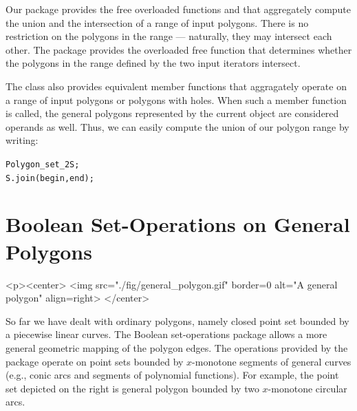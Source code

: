 Our package provides the free overloaded functions  and
 that aggregately compute the union and the intersection
of a range of input polygons. There is no restriction on the polygons in the
range --- naturally, they may intersect each other.
The package provides the overloaded free function 
 that determines whether the polygons in the
range defined by the two input iterators \ccc{[begin, end)} intersect.

The class  also provides equivalent member
functions that aggragately operate on a range of input polygons or
polygons with holes. When such a member function is called, the general 
polygons represented by the current object are considered operands as 
well. Thus, we can easily compute the union of our polygon range by
writing:
\begin{alltt}
  Polygon_set_2   S;
  S.join (begin, end);
\end{alltt} 


\section{Boolean Set-Operations on General Polygons}
\label{bops_sec:bops_gen}

\lcTex{%
  \setlength{\widthRight}{1.4cm}
  \setlength{\widthLeft}{\widthLineReal}
  \addtolength{\widthLeft}{-\widthRight}
  \begin{minipage}{\widthLeft}
}
\label{fig:general_polygon}
\begin{ccHtmlOnly}
  <p><center>
    <img src="./fig/general_polygon.gif" border=0 alt="A general polygon" align=right>
  </center>
\end{ccHtmlOnly}
So far we have dealt with ordinary polygons, namely closed point set bounded
by a piecewise linear curves. The Boolean set-operations package allows
a more general geometric mapping of the polygon edges. The operations provided
by the package operate on point sets bounded by $x$-monotone segments of
general curves (e.g., conic arcs and segments of polynomial functions).
For example, the point set depicted on the right is general polygon bounded
by two $x$-monotone circular arcs.
\\

